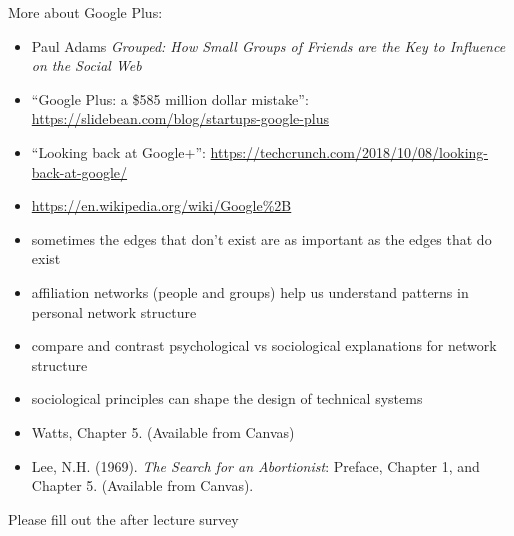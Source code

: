 \documentclass[aspectratio=169]{beamer}
\begin{document}
\begin{frame}

More about Google Plus:
\begin{itemize}
\item Paul Adams \textit{Grouped: How Small Groups of Friends are the Key to Influence on the Social Web}
\item ``Google Plus: a \$585 million dollar mistake'': \url{https://slidebean.com/blog/startups-google-plus}
\item ``Looking back at Google+'': \url{https://techcrunch.com/2018/10/08/looking-back-at-google/}
\item \url{https://en.wikipedia.org/wiki/Google\%2B}
\end{itemize}

\end{frame}
\begin{frame}

\begin{itemize}
\item sometimes the edges that don't exist are as important as the edges that do exist
\pause
\item affiliation networks (people and groups) help us understand patterns in personal network structure
\pause
\item compare and contrast psychological vs sociological explanations for network structure 
\pause
\item sociological principles can shape the design of technical systems
\end{itemize}

\end{frame}
\begin{frame}

\begin{itemize}
\item Watts, Chapter 5. (Available from Canvas)
\item Lee, N.H. (1969). \textit{The Search for an Abortionist}: Preface, Chapter 1, and Chapter 5. (Available from Canvas). 
\end{itemize}


\end{frame}
\begin{frame}

Please fill out the after lecture survey

\end{frame}
\end{document}
